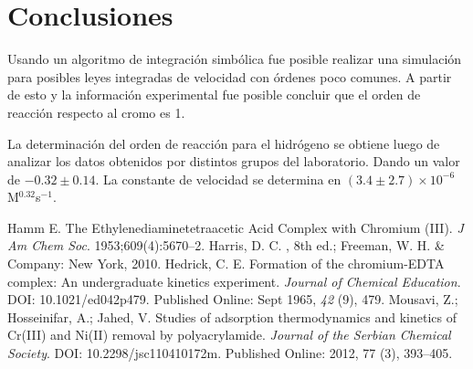 \documentclass[fleqn,10pt]{SelfArx} %
\begin{document}
	\section{Conclusiones}
	Usando un algoritmo de integraci\'on simb\'olica fue posible realizar una simulaci\'on para posibles leyes integradas de velocidad con \'ordenes poco comunes. A partir de esto y la informaci\'on experimental fue posible concluir que el orden de reacci\'on respecto al cromo es 1.
	
	La determinaci\'on del orden de reacci\'on para el hidr\'ogeno se obtiene luego de analizar los datos obtenidos por distintos grupos del laboratorio. Dando un valor de $-0.32\pm0.14$. La constante de velocidad se determina en $(3.4\pm 2.7)\times10^{-6}$ M$^{0.32}$s$^{-1}$.
	
	\begin{thebibliography}{9}
		Hamm E. The Ethylenediaminetetraacetic Acid Complex with Chromium (III). \textit{J Am Chem Soc}. 1953;609(4):5670–2. 
		Harris, D. C. , 8th ed.; Freeman, W. H. & Company: New York, 2010.
		Hedrick, C. E. Formation of the chromium-EDTA complex: An undergraduate kinetics experiment. \textit{Journal of Chemical Education}. DOI: 10.1021/ed042p479. Published Online: Sept 1965, \textit{42} (9), 479.
		Mousavi, Z.; Hosseinifar, A.; Jahed, V. Studies of adsorption thermodynamics and kinetics of Cr(III) and Ni(II) removal by polyacrylamide. \textit{Journal of the Serbian Chemical Society}. DOI: 10.2298/jsc110410172m. Published Online: 2012, 77 (3), 393–405.
		 
	\end{thebibliography}
\end{document}
